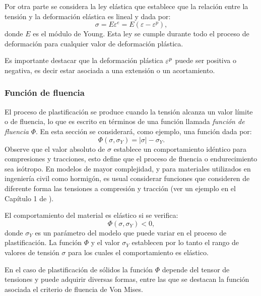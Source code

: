 Por otra parte se considera la ley elástica que establece que la relación entre la tensión y la deformación elástica es lineal y dada por:
%
\begin{equation}\label{eqn:plasleyelas}
\sigma =  E \varepsilon^e = E(\varepsilon - \varepsilon^p ),
\end{equation}
%
donde $E$ es el módulo de Young. Esta ley se cumple durante todo el proceso de deformación para cualquier valor de deformación plástica.

Es importante destacar que la deformación plástica $\varepsilon^p$ puede ser positiva o negativa, es decir estar asociada a una extensión o un acortamiento.

\subsubsection{Función de fluencia}

El proceso de plastificación se produce cuando la tensión alcanza un valor límite o de fluencia, lo que es escrito en términos de una función llamada \textit{función de fluencia} $\Phi$. En esta sección se considerará, como ejemplo, una función dada por:
%
\begin{equation}\label{eqn:defphi}
\Phi (\sigma, \sigma_Y) = |\sigma| - \sigma_Y.
\end{equation}
%
Observe que el valor absoluto de $\sigma$ establece un comportamiento idéntico para compresiones y tracciones, esto define que el proceso de fluencia o endurecimiento sea isótropo. %
%
En modelos de mayor complejidad, y para materiales utilizados en ingeniería civil como hormigón, es usual considerar funciones que consideren de diferente forma las tensiones a compresión y tracción (ver un ejemplo en el Capítulo 1 de \citep{Simo1998}).


El comportamiento del material es elástico si se verifica:
%
\begin{equation}
\Phi(\sigma,\sigma_Y) < 0,
\end{equation}
%
donde $\sigma_Y$ es un parámetro del modelo que puede variar en el proceso de plastificación. %
%
La función $\Phi$ y el valor $\sigma_Y$ establecen por lo tanto el rango de valores de tensión $\sigma$ para los cuales el comportamiento es elástico.

En el caso de plastificación de sólidos la función $\Phi$ depende del tensor de tensiones y puede adquirir diversas formas, entre las que se destacan la función asociada el criterio de fluencia de Von Mises. %
%


